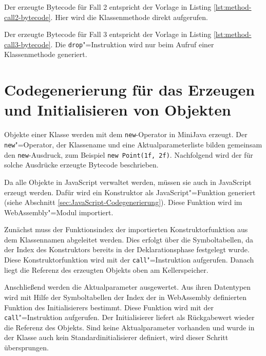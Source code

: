 Der erzeugte Bytecode für Fall 2 entspricht der Vorlage in Listing \ref{lst:method-call2-bytecode}. Hier wird die Klassenmethode direkt aufgerufen. 



Der erzeugte Bytecode für Fall 3 entspricht der Vorlage in Listing \ref{lst:method-call3-bytecode}. Die \lstinline{drop}"=Instruktion wird nur beim Aufruf einer Klassenmethode generiert.



\section{Codegenerierung für das Erzeugen und Initialisieren von Objekten}
\label{sec:Codegenerierung-für-das-Erzeugen-und-Initialisieren-von-Objekten}
Objekte einer Klasse werden mit dem \lstinline{new}-Operator in MiniJava erzeugt. Der \lstinline{new}"=Operator, der Klassename und eine Aktualparameterliste bilden gemeinsam den \lstinline{new}-Ausdruck, zum Beispiel \lstinline{new Point(1f, 2f)}. Nachfolgend wird der für solche Ausdrücke erzeugte Bytecode beschrieben.

Da alle Objekte in JavaScript verwaltet werden, müssen sie auch in JavaScript erzeugt werden. Dafür wird ein Konstruktor als JavaScript"=Funktion generiert (siehe Abschnitt \ref{sec:JavaScript-Codegenerierung}). Diese Funktion wird im WebAssembly"=Modul importiert.

Zunächst muss der Funktionsindex der importierten Konstruktorfunktion aus dem Klassennamen abgeleitet werden. Dies erfolgt über die Symboltabellen, da der Index des Konstruktors bereits in der Deklarationsphase festgelegt wurde. Diese Konstruktorfunktion wird mit der \lstinline{call}"=Instruktion aufgerufen. Danach liegt die Referenz des erzeugten Objekts oben am Kellerspeicher.

Anschließend werden die Aktualparameter ausgewertet. Aus ihren Datentypen wird mit Hilfe der Symboltabellen der Index der in WebAssembly definierten Funktion des Initialisierers bestimmt. Diese Funktion wird mit der \lstinline{call}"=Instruktion aufgerufen. Der Initialisierer liefert als Rückgabewert wieder die Referenz des Objekts. Sind keine Aktualparameter vorhanden und wurde in der Klasse auch kein Standardinitialisierer definiert, wird dieser Schritt übersprungen.

